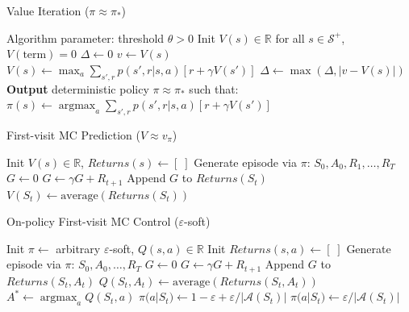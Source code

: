 \documentclass[10pt]{article}
\DeclareMathOperator*{\argmax}{argmax}
\begin{document}
\begin{multicols*}{2}
	\begin{algorithm}[H]
		\caption{Value Iteration ($\pi \approx \pi_*$)}
		\begin{algorithmic}[1]
			\State Algorithm parameter: threshold $\theta > 0$
			\State Init $V(s) \in \mathbb{R}$ for all $s \in \mathcal{S}^+$, $V(\text{term}) = 0$
			\Repeat
			\State $\Delta \gets 0$
			\State $v \gets V(s)$
			\State $V(s) \gets \max_a \sum_{s', r} p(s', r | s, a) [r + \gamma V(s')]$
			\State $\Delta \gets \max(\Delta, |v - V(s)|)$
			\EndFor
			\Until{$\Delta < \theta$}
			\State \textbf{Output} deterministic policy $\pi \approx \pi_*$ such that:
			\State $\pi(s) \gets \argmax_a \sum_{s', r} p(s', r | s, a) [r + \gamma V(s')]$
			\EndFor
		\end{algorithmic}
	\end{algorithm}


	\begin{algorithm}[H]
		\caption{First-visit MC Prediction ($V \approx v_\pi$)}
		\begin{algorithmic}[1]
			\State Init $V(s) \in \mathbb{R}$, $Returns(s) \gets [\;]$
			\State Generate episode via $\pi$: $S_0, A_0, R_1, \dots, R_T$
			\State $G \gets 0$
			\State $G \gets \gamma G + R_{t+1}$
			\State Append $G$ to $Returns(S_t)$
			\State $V(S_t) \gets \text{average}(Returns(S_t))$
			\EndIf
			\EndFor
			\EndFor
		\end{algorithmic}
	\end{algorithm}

	\begin{algorithm}[H]
		\caption{On-policy First-visit MC Control ($\varepsilon$-soft)}
		\begin{algorithmic}[1]
			\State Init $\pi \gets$ arbitrary $\varepsilon$-soft, $Q(s,a) \in \mathbb{R}$
			\State Init $Returns(s,a) \gets [\;]$
			\State Generate episode via $\pi$: $S_0, A_0, \dots, R_T$
			\State $G \gets 0$
			\State $G \gets \gamma G + R_{t+1}$
			\State Append $G$ to $Returns(S_t, A_t)$
			\State $Q(S_t, A_t) \gets \text{average}(Returns(S_t, A_t))$
			\State $A^* \gets \argmax_a Q(S_t, a)$
			\State $\pi(a | S_t) \gets 1 - \varepsilon + \varepsilon/|\mathcal{A}(S_t)|$
			\Else
			\State $\pi(a | S_t) \gets \varepsilon/|\mathcal{A}(S_t)|$
			\EndIf
			\EndFor
			\EndIf
			\EndFor
			\EndFor
		\end{algorithmic}
	\end{algorithm}


\end{multicols*}
\end{document}
